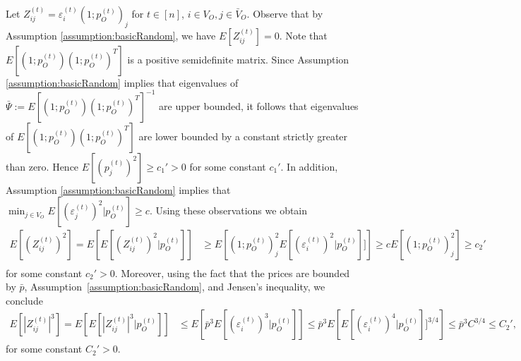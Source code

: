 \documentclass[opre,nonblindrev]{informs3} %
\begin{document}
\begin{APPENDIX}{}
 	
 	Let $Z^{(t)}_{ij}= \varepsilon_i^{(t)} (1;p_O^{(t)})_j$
 	for $t\in[n]$, $i\in V_O, j\in \bar V_{O}$.
 	Observe that
 	by Assumption \ref{assumption:basicRandom},   we have $E[Z_{ij}^{(t)}]=0$.
 	Note that ${E}[(1;{p}_O^{(t)})
 	(1;{p}_O^{(t)})^T]$ is a positive semidefinite matrix.
 	Since Assumption \ref{assumption:basicRandom} implies that
 	eigenvalues of
 	$\bar \Psi:=E[(1;p_O^{(t)})(1;p_O^{(t)})^T]^{-1}$  are upper bounded, it follows that 
 	eigenvalues of
 	${E}[(1;{p}_O^{(t)})
 	(1;{p}_O^{(t)})^T]$
 	are
 	lower bounded by a constant strictly greater than zero.
 	Hence
 	$E[(p_j^{(t)})^2]\geq c_1'>0$ for some constant $c_1'$.
 	In addition, Assumption \ref{assumption:basicRandom} implies that
 	$\min_{j\in V_O} E[(\varepsilon_j^{(t)})^2|p_O^{(t)}] \geq c$.
 	Using these observations
 	we  obtain
 	\begin{equation}\label{eq:1stEqBound}
 	\begin{aligned}
 	E[(Z^{(t)}_{ij})^2] = E \left[ E[(Z^{(t)}_{ij})^2 | p_O^{(t)}] \right]
 	&\geq
 	E\left[  (1;p_O^{(t)})_j^2
 	E[(\varepsilon_i^{(t)})^2| p_O^{(t)}]  ] \right]
 	\geq c E\left[ (1;p_O^{(t)})_j^2\right] \geq { c_2'}  \\
 	\end{aligned}
 	\end{equation}
 	for some constant $c_2'>0$.
 	Moreover, using the fact that the prices are bounded by $\bar p$, 
 	Assumption~\ref{assumption:basicRandom}, 
 	and Jensen's inequality,
 	we conclude
 	\begin{equation}\label{eq:2ndEqBound}
 	\begin{aligned}
 	E[|Z^{(t)}_{ij}|^3] = E \left[ E[|Z^{(t)}_{ij}|^3 | p_O^{(t)}] \right] &\leq
 	E\left[
 	\bar{p}^3
 	E[(\varepsilon_i^{(t)})^3| p_O^{(t)}]   \right]
 	\leq 
 	\bar{p}^3
 	E \left[E[(\varepsilon_i^{(t)})^4| p_O^{(t)}]  ]^{3/4}  \right]
 	\leq
 	\bar{p}^3C^{3/4} \leq C_2',
 	\end{aligned}
 	\end{equation}
 	for some constant  $C_2' >0$.
 	

\end{APPENDIX}
\end{document}
